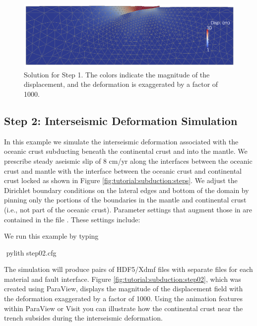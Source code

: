 \begin{figure}
  \includegraphics[width=4.5in]{examples/figs/subduction_step01_soln}
  \caption{Solution for Step 1. The colors indicate the magnitude of the displacement,
    and the deformation is exaggerated by a factor of 1000. }
  \label{fig:tutorial:subduction:step01}
\end{figure}


\subsection{Step 2: Interseismic Deformation Simulation}

In this example we simulate the interseismic deformation associated
with the oceanic crust subducting beneath the continental crust and
into the mantle. We prescribe steady aseismic slip of 8 cm/yr along
the interfaces between the oceanic crust and mantle with the interface
between the oceanic crust and continental crust locked as shown in
Figure \vref{fig:tutorial:subduction:steps}. We adjust the Dirichlet
boundary conditions on the lateral edges and bottom of the domain
by pinning only the portions of the boundaries in the mantle and continental
crust (i.e., not part of the oceanic crust). Parameter settings that
augment those in  are contained in the file
. These settings include:
\begin{inventory}
\end{inventory}
We run this example by typing
\begin{shell}
$$ pylith step02.cfg
\end{shell}
The simulation will produce pairs of HDF5/Xdmf files with separate
files for each material and fault interface. Figure
\vref{fig:tutorial:subduction:step02}, which was created using
ParaView, displays the magnitude of the displacement field with the
deformation exaggerated by a factor of 1000. Using the animation
features within ParaView or Visit you can illustrate how the
continental crust near the trench subsides during the interseismic
deformation.

